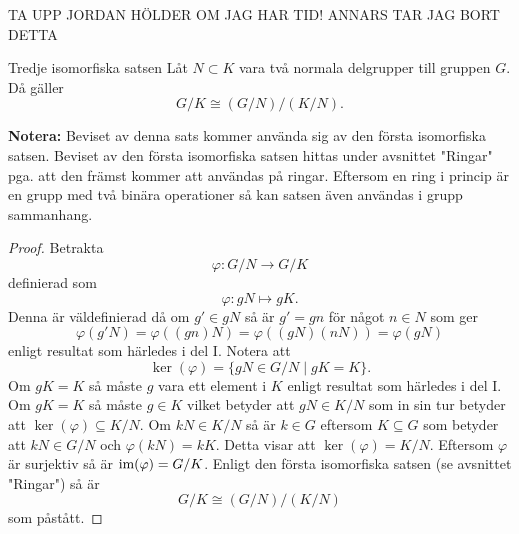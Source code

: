 \documentclass{article}
\newcommand{\im}[0]{\textnormal{im}}
\theoremstyle{definition}
\begin{document}
TA UPP JORDAN HÖLDER OM JAG HAR TID! ANNARS TAR JAG BORT DETTA


\begin{mytheo}{Tredje isomorfiska satsen}{}
  Låt $N \subset K$ vara två normala delgrupper till gruppen $G$. Då gäller 
  \[G/K \cong (G/N)/(K/N).\]
\end{mytheo}
\textbf{Notera:} Beviset av denna sats kommer använda sig av den första isomorfiska satsen. Beviset av den första isomorfiska satsen 
hittas under avsnittet "Ringar" pga. att den främst kommer att användas på ringar. Eftersom en ring i princip är en grupp med två binära operationer 
så kan satsen även användas i grupp sammanhang. 

\begin{proof}
  Betrakta 
  \[\varphi: G/N \rightarrow G/K\]
  definierad som 
  \[\varphi: gN \mapsto gK.\]
  Denna är väldefinierad då om $g' \in gN$ så är $g' = gn$ för något $n \in N$ som ger 
  \[\varphi(g'N) = \varphi((gn)N) = \varphi( (gN)(nN) ) = \varphi(gN)\]
  enligt resultat som härledes i del I. Notera att 
  \[\ker(\varphi) = \{gN \in G/N \; | \; gK = K \}.\]
  Om $gK = K$ så måste $g$ vara ett element i $K$ enligt resultat som härledes i del I. 
  Om $gK = K$ så måste $g \in K$ vilket betyder att $gN \in K/N$ som in sin tur betyder att $\ker(\varphi) \subseteq K/N$.
  Om $kN \in K/N$ så är $k \in G$ eftersom $K \subseteq G$ som betyder att $kN \in G/N$ och $\varphi(kN) = kK$. 
  Detta visar att $\ker(\varphi) = K/N.$ Eftersom $\varphi$ är surjektiv så är $\im(\varphi) = G/K$. Enligt 
  den första isomorfiska satsen (se avsnittet "Ringar") så är 
  \[G/K \cong (G/N)/(K/N)\]
  som påstått.
\end{proof}
\end{document}
